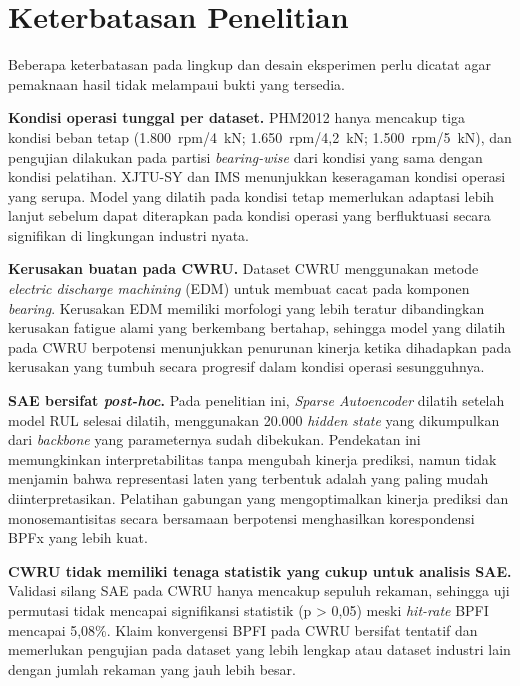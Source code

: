 \section{Keterbatasan Penelitian}
\label{sec:bab6_keterbatasan}

Beberapa keterbatasan pada lingkup dan desain eksperimen perlu dicatat agar
pemaknaan hasil tidak melampaui bukti yang tersedia.

\textbf{Kondisi operasi tunggal per dataset.} PHM2012 hanya mencakup tiga
kondisi beban tetap (1.800~rpm/4~kN; 1.650~rpm/4,2~kN; 1.500~rpm/5~kN),
dan pengujian dilakukan pada partisi \emph{bearing-wise} dari kondisi yang
sama dengan kondisi pelatihan. XJTU-SY dan IMS menunjukkan keseragaman kondisi
operasi yang serupa. Model yang dilatih pada kondisi tetap memerlukan adaptasi
lebih lanjut sebelum dapat diterapkan pada kondisi operasi yang berfluktuasi
secara signifikan di lingkungan industri nyata.

\textbf{Kerusakan buatan pada CWRU.} Dataset CWRU menggunakan metode
\emph{electric discharge machining} (EDM) untuk membuat cacat pada komponen
\emph{bearing}. Kerusakan EDM memiliki morfologi yang lebih teratur dibandingkan
kerusakan fatigue alami yang berkembang bertahap, sehingga model yang dilatih
pada CWRU berpotensi menunjukkan penurunan kinerja ketika dihadapkan pada
kerusakan yang tumbuh secara progresif dalam kondisi operasi sesungguhnya.

\textbf{SAE bersifat \emph{post-hoc}.} Pada penelitian ini, \emph{Sparse
Autoencoder} dilatih setelah model RUL selesai dilatih, menggunakan 20.000
\emph{hidden state} yang dikumpulkan dari \emph{backbone} yang parameternya
sudah dibekukan. Pendekatan ini memungkinkan interpretabilitas tanpa mengubah
kinerja prediksi, namun tidak menjamin bahwa representasi laten yang terbentuk
adalah yang paling mudah diinterpretasikan. Pelatihan gabungan yang
mengoptimalkan kinerja prediksi dan monosemantisitas secara bersamaan
berpotensi menghasilkan korespondensi BPFx yang lebih kuat.

\textbf{CWRU tidak memiliki tenaga statistik yang cukup untuk analisis SAE.}
Validasi silang SAE pada CWRU hanya mencakup sepuluh rekaman, sehingga uji
permutasi tidak mencapai signifikansi statistik (p > 0,05) meski
\emph{hit-rate} BPFI mencapai 5,08\%. Klaim konvergensi BPFI pada CWRU
bersifat tentatif dan memerlukan pengujian pada dataset yang lebih lengkap
atau dataset industri lain dengan jumlah rekaman yang jauh lebih besar.

